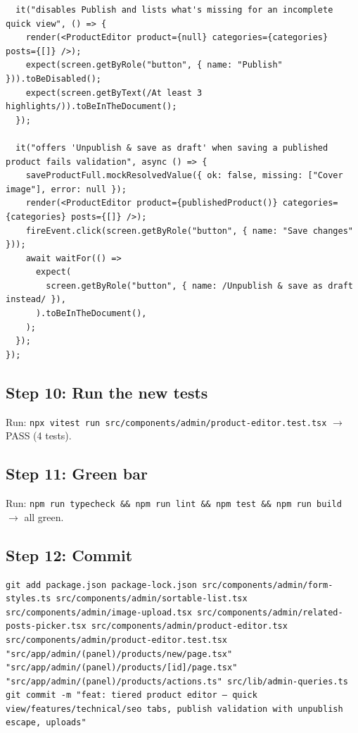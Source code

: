 \documentclass[11pt,a4paper]{article}
\begin{document}
\begin{lstlisting}
  it("disables Publish and lists what's missing for an incomplete quick view", () => {
    render(<ProductEditor product={null} categories={categories} posts={[]} />);
    expect(screen.getByRole("button", { name: "Publish" })).toBeDisabled();
    expect(screen.getByText(/At least 3 highlights/)).toBeInTheDocument();
  });

  it("offers 'Unpublish & save as draft' when saving a published product fails validation", async () => {
    saveProductFull.mockResolvedValue({ ok: false, missing: ["Cover image"], error: null });
    render(<ProductEditor product={publishedProduct()} categories={categories} posts={[]} />);
    fireEvent.click(screen.getByRole("button", { name: "Save changes" }));
    await waitFor(() =>
      expect(
        screen.getByRole("button", { name: /Unpublish & save as draft instead/ }),
      ).toBeInTheDocument(),
    );
  });
});
\end{lstlisting}

\subsection*{Step 10: Run the new tests}

Run: \texttt{npx vitest run src/components/admin/product-editor.test.tsx} $\rightarrow$ PASS (4 tests).

\subsection*{Step 11: Green bar}

Run: \texttt{npm run typecheck \&\& npm run lint \&\& npm test \&\& npm run build} $\rightarrow$ all
green.

\subsection*{Step 12: Commit}

\begin{lstlisting}
git add package.json package-lock.json src/components/admin/form-styles.ts src/components/admin/sortable-list.tsx src/components/admin/image-upload.tsx src/components/admin/related-posts-picker.tsx src/components/admin/product-editor.tsx src/components/admin/product-editor.test.tsx "src/app/admin/(panel)/products/new/page.tsx" "src/app/admin/(panel)/products/[id]/page.tsx" "src/app/admin/(panel)/products/actions.ts" src/lib/admin-queries.ts
git commit -m "feat: tiered product editor — quick view/features/technical/seo tabs, publish validation with unpublish escape, uploads"
\end{lstlisting}
\end{document}
